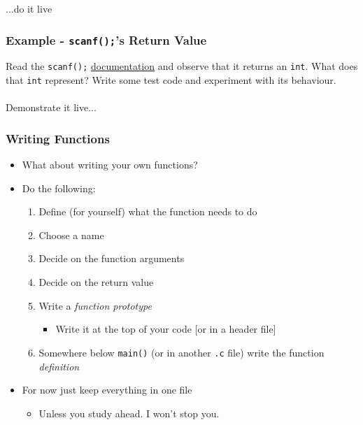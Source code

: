 \documentclass[14pt]{beamer}
\begin{document}
\begin{frame}
\begin{center}
...do it live
\end{center}
\end{frame}

\begin{frame}
\frametitle{Example - \texttt{scanf();}'s Return Value}
Read the \texttt{scanf();} \underline{\href{http://man7.org/linux/man-pages/man3/scanf.3.html}{documentation}} and observe that it returns an \texttt{int}. What does that \texttt{int} represent? Write some test code and experiment with its behaviour.
\\~\\
Demonstrate it live...
\end{frame}

\begin{frame}
\frametitle{Writing Functions}
\begin{itemize}
\item What about writing your own functions?
\pause
\item Do the following:
	\begin{enumerate}
		\item Define (for yourself) what the function needs to do
		\pause
		\item Choose a name
		\pause
		\item Decide on the function arguments
		\pause
		\item Decide on the return value
		\pause
		\item Write a \textit{function prototype}
			\begin{itemize}
				\item Write it at the top of your code [or in a header file]
			\end{itemize}
		\pause
		\item Somewhere below \texttt{main()} (or in another \texttt{.c} file) write the function \textit{definition}
	\end{enumerate}
\pause
\item For now just keep everything in one file
	\begin{itemize}
		\item Unless you study ahead. I won't stop you.
	\end{itemize}
\end{itemize}
\end{frame}
\end{document}
